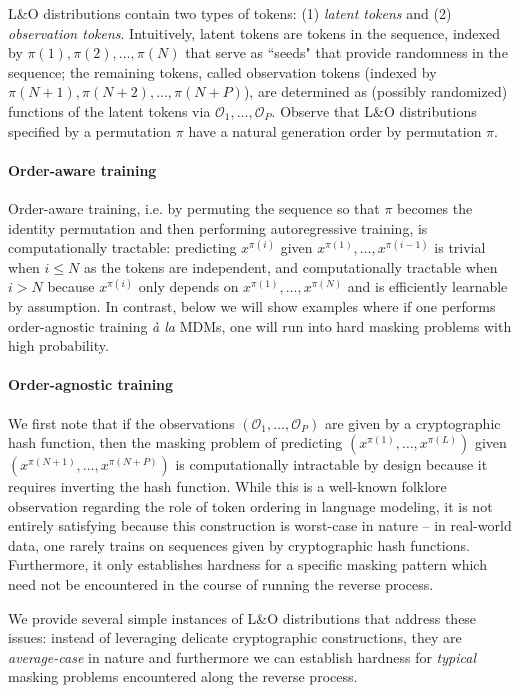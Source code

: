 \documentclass{article}
\theoremstyle{plain}
\theoremstyle{definition}
\theoremstyle{remark}
\begin{document}
L\&O distributions contain two types of tokens: (1) \emph{latent tokens} and (2) \emph{observation tokens}. Intuitively, latent tokens are tokens in the sequence, indexed by $\pi(1), \pi(2), \ldots, \pi(N)$ that serve as ``seeds" that provide randomness in the sequence; the remaining tokens, called observation tokens (indexed by $\pi(N+1), \pi(N+2), \ldots, \pi(N+P)$), are determined as (possibly randomized) functions of the latent tokens via $\mathcal{O}_1,\ldots,\mathcal{O}_P$.  Observe that L\&O distributions specified by a permutation $\pi$ have a natural generation order by permutation $\pi$. 


\paragraph{Order-aware training} Order-aware training, i.e. by permuting the sequence so that $\pi$ becomes the identity permutation and then performing autoregressive training, is computationally tractable: predicting $x^{\pi(i)}$ given $x^{\pi(1)},\ldots,x^{\pi(i-1)}$ is trivial when $i \le N$ as the tokens are independent, and computationally tractable when $i > N$ because $x^{\pi(i)}$ only depends on $x^{\pi(1)},\ldots,x^{\pi(N)}$ and is efficiently learnable by assumption. In contrast, below we will show examples where if one performs order-agnostic training \emph{à la} MDMs, one will run into hard masking problems with high probability.


\paragraph{Order-agnostic training} We first note that if the observations $(\mathcal{O}_1,\ldots,\mathcal{O}_P)$ are given by a cryptographic hash function, then the masking problem of predicting $(x^{\pi(1)},\ldots,x^{\pi(L)})$ given $(x^{\pi(N+1)},\ldots,x^{\pi(N+P)})$ is computationally intractable by design because it requires inverting the hash function. While this is a well-known folklore observation regarding the role of token ordering in language modeling, it is not entirely satisfying because this construction is worst-case in nature \--- in real-world data, one rarely trains on sequences given by cryptographic hash functions. Furthermore, it only establishes hardness for a specific masking pattern which need not be encountered in the course of running the reverse process.

We provide several simple instances of L\&O distributions that address these issues: instead of leveraging delicate cryptographic constructions, they are \emph{average-case} in nature and furthermore we can establish hardness for \emph{typical} masking problems encountered along the reverse process. 
\end{document}
